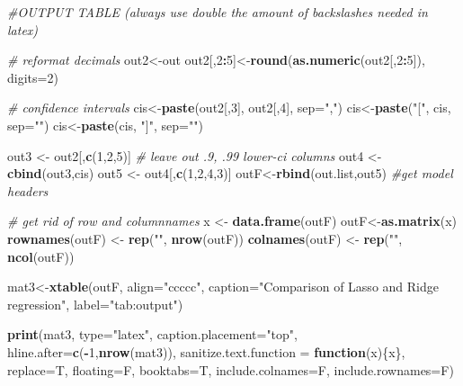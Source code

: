 \documentclass[
]{article}
\newenvironment{Shaded}{\begin{snugshade}}{\end{snugshade}}
\newcommand{\CommentTok}[1]{\textcolor[rgb]{0.56,0.35,0.01}{\textit{#1}}}
\newcommand{\ControlFlowTok}[1]{\textcolor[rgb]{0.13,0.29,0.53}{\textbf{#1}}}
\newcommand{\DataTypeTok}[1]{\textcolor[rgb]{0.13,0.29,0.53}{#1}}
\newcommand{\DecValTok}[1]{\textcolor[rgb]{0.00,0.00,0.81}{#1}}
\newcommand{\KeywordTok}[1]{\textcolor[rgb]{0.13,0.29,0.53}{\textbf{#1}}}
\newcommand{\NormalTok}[1]{#1}
\newcommand{\OperatorTok}[1]{\textcolor[rgb]{0.81,0.36,0.00}{\textbf{#1}}}
\newcommand{\StringTok}[1]{\textcolor[rgb]{0.31,0.60,0.02}{#1}}
\begin{document}
\begin{Shaded}
\begin{Highlighting}[]
\CommentTok{#OUTPUT TABLE (always use double the amount of backslashes needed in latex)}

\CommentTok{# reformat decimals}
\NormalTok{out2<-out}
\NormalTok{out2[,}\DecValTok{2}\OperatorTok{:}\DecValTok{5}\NormalTok{]<-}\KeywordTok{round}\NormalTok{(}\KeywordTok{as.numeric}\NormalTok{(out2[,}\DecValTok{2}\OperatorTok{:}\DecValTok{5}\NormalTok{]), }\DataTypeTok{digits=}\DecValTok{2}\NormalTok{)}

\CommentTok{# confidence intervals}
\NormalTok{cis<-}\KeywordTok{paste}\NormalTok{(out2[,}\DecValTok{3}\NormalTok{], out2[,}\DecValTok{4}\NormalTok{], }\DataTypeTok{sep=}\StringTok{","}\NormalTok{)}
\NormalTok{cis<-}\KeywordTok{paste}\NormalTok{(}\StringTok{"["}\NormalTok{, cis, }\DataTypeTok{sep=}\StringTok{""}\NormalTok{)}
\NormalTok{cis<-}\KeywordTok{paste}\NormalTok{(cis, }\StringTok{"]"}\NormalTok{, }\DataTypeTok{sep=}\StringTok{""}\NormalTok{)}

\NormalTok{out3 <-}\StringTok{ }\NormalTok{out2[,}\KeywordTok{c}\NormalTok{(}\DecValTok{1}\NormalTok{,}\DecValTok{2}\NormalTok{,}\DecValTok{5}\NormalTok{)] }\CommentTok{# leave out .9, .99 lower-ci columns}
\NormalTok{out4 <-}\StringTok{ }\KeywordTok{cbind}\NormalTok{(out3,cis)}
\NormalTok{out5 <-}\StringTok{ }\NormalTok{out4[,}\KeywordTok{c}\NormalTok{(}\DecValTok{1}\NormalTok{,}\DecValTok{2}\NormalTok{,}\DecValTok{4}\NormalTok{,}\DecValTok{3}\NormalTok{)] }
\NormalTok{outF<-}\KeywordTok{rbind}\NormalTok{(out.list,out5) }\CommentTok{#get model headers}

\CommentTok{# get rid of row and columnnames}
\NormalTok{x <-}\StringTok{ }\KeywordTok{data.frame}\NormalTok{(outF)}
\NormalTok{outF<-}\KeywordTok{as.matrix}\NormalTok{(x)}
\KeywordTok{rownames}\NormalTok{(outF) <-}\StringTok{ }\KeywordTok{rep}\NormalTok{(}\StringTok{""}\NormalTok{, }\KeywordTok{nrow}\NormalTok{(outF))}
\KeywordTok{colnames}\NormalTok{(outF) <-}\StringTok{ }\KeywordTok{rep}\NormalTok{(}\StringTok{""}\NormalTok{, }\KeywordTok{ncol}\NormalTok{(outF))}

\NormalTok{mat3<-}\KeywordTok{xtable}\NormalTok{(outF, }\DataTypeTok{align=}\StringTok{"ccccc"}\NormalTok{, }\DataTypeTok{caption=}\StringTok{"Comparison of Lasso and Ridge regression"}\NormalTok{, }\DataTypeTok{label=}\StringTok{"tab:output"}\NormalTok{) }

\KeywordTok{print}\NormalTok{(mat3, }\DataTypeTok{type=}\StringTok{"latex"}\NormalTok{, }\DataTypeTok{caption.placement=}\StringTok{"top"}\NormalTok{, }\DataTypeTok{hline.after=}\KeywordTok{c}\NormalTok{(}\OperatorTok{-}\DecValTok{1}\NormalTok{,}\KeywordTok{nrow}\NormalTok{(mat3)), }\DataTypeTok{sanitize.text.function =} \ControlFlowTok{function}\NormalTok{(x)\{x\}, }\DataTypeTok{replace=}\NormalTok{T, }\DataTypeTok{floating=}\NormalTok{F, }\DataTypeTok{booktabs=}\NormalTok{T, }\DataTypeTok{include.colnames=}\NormalTok{F, }\DataTypeTok{include.rownames=}\NormalTok{F)}
\end{Highlighting}
\end{Shaded}
\end{document}
